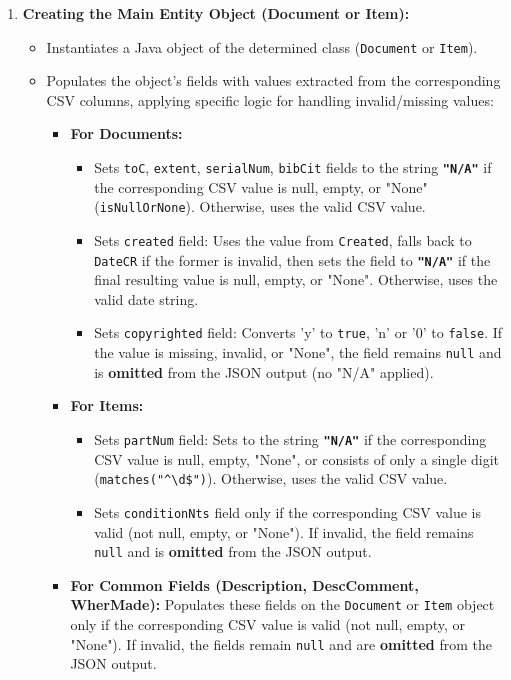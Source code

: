 \documentclass[11pt, a4paper]{article}
\begin{document}
\begin{enumerate}
    \item \textbf{Creating the Main Entity Object (Document or Item):}
        \begin{itemize}
            \item Instantiates a Java object of the determined class (\texttt{Document} or \texttt{Item}).
            \item Populates the object's fields with values extracted from the corresponding CSV columns, applying specific logic for handling invalid/missing values:
                \begin{itemize}
                    \item \textbf{For Documents:}
                        \begin{itemize}
                        \item Sets \texttt{toC}, \texttt{extent}, \texttt{serialNum}, \texttt{bibCit} fields to the string \textbf{\texttt{"N/A"}} if the corresponding CSV value is null, empty, or "None" (\texttt{isNullOrNone}). Otherwise, uses the valid CSV value.
                        \item Sets \texttt{created} field: Uses the value from \texttt{Created}, falls back to \texttt{DateCR} if the former is invalid, then sets the field to \textbf{\texttt{"N/A"}} if the final resulting value is null, empty, or "None". Otherwise, uses the valid date string.
                        \item Sets \texttt{copyrighted} field: Converts 'y' to \texttt{true}, 'n' or '0' to \texttt{false}. If the value is missing, invalid, or "None", the field remains \texttt{null} and is \textbf{omitted} from the JSON output (no "N/A" applied).
                        \end{itemize}
                    \item \textbf{For Items:}
                        \begin{itemize}
                        \item Sets \texttt{partNum} field: Sets to the string \textbf{\texttt{"N/A"}} if the corresponding CSV value is null, empty, "None", or consists of only a single digit (\texttt{matches("\^{}\textbackslash{}d\$")}). Otherwise, uses the valid CSV value.
                        \item Sets \texttt{conditionNts} field only if the corresponding CSV value is valid (not null, empty, or "None"). If invalid, the field remains \texttt{null} and is \textbf{omitted} from the JSON output.
                        \end{itemize}
                    \item \textbf{For Common Fields (Description, DescComment, WherMade):} Populates these fields on the \texttt{Document} or \texttt{Item} object only if the corresponding CSV value is valid (not null, empty, or "None"). If invalid, the fields remain \texttt{null} and are \textbf{omitted} from the JSON output.
                \end{itemize}
        \end{itemize}


\end{enumerate}
\end{document}
